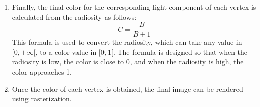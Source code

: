 \begin{enumerate}
\begin{itemize}
        However, it is more computationally expensive than the flat method, and it needs to take into account the normals, as there are cases where real edges exist in the scene.
    \end{itemize}
    \item Finally, the final color for the corresponding light component of each vertex is calculated from the radiosity as follows:
    \begin{equation*}
        C = \frac{B}{B+1}
    \end{equation*}
    This formula is used to convert the radiosity, which can take any value in $[0, +\infty[$, to a color value in $[0, 1[$. The formula is designed so that when the radiosity is low, the color is close to 0, and when the radiosity is high, the color approaches 1.
    \item Once the color of each vertex is obtained, the final image can be rendered using rasterization.
\end{enumerate}